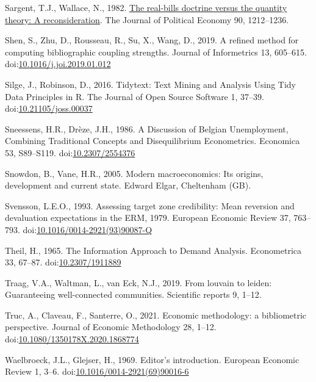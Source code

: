 \documentclass[
  12pt,
  onecolumn]{article}
\newlength{\cslhangindent}
\newlength{\cslentryspacingunit} %
\newenvironment{CSLReferences}[2] %
 {%
  \setlength{\parindent}{0pt}
  \ifodd #1
  \let\oldpar\par
  \def\par{\hangindent=\cslhangindent\oldpar}
  \fi
  \setlength{\parskip}{#2\cslentryspacingunit}
 }%
 {}
\begin{document}
\begin{CSLReferences}{1}{0}
\leavevmode{}%
Sargent, T.J., Wallace, N., 1982. \href{http://www.jstor.org/stable/1830945}{The real-bills doctrine versus the quantity theory: {A} reconsideration}. The Journal of Political Economy 90, 1212--1236.

\leavevmode{}%
Shen, S., Zhu, D., Rousseau, R., Su, X., Wang, D., 2019. A refined method for computing bibliographic coupling strengths. Journal of Informetrics 13, 605--615. doi:\href{https://doi.org/10.1016/j.joi.2019.01.012}{10.1016/j.joi.2019.01.012}

\leavevmode{}%
Silge, J., Robinson, D., 2016. Tidytext: {Text Mining} and {Analysis Using Tidy Data Principles} in {R}. The Journal of Open Source Software 1, 37--39. doi:\href{https://doi.org/10.21105/joss.00037}{10.21105/joss.00037}

\leavevmode{}%
Sneessens, H.R., Drèze, J.H., 1986. A {Discussion} of {Belgian Unemployment}, {Combining Traditional Concepts} and {Disequilibrium Econometrics}. Economica 53, S89--S119. doi:\href{https://doi.org/10.2307/2554376}{10.2307/2554376}

\leavevmode{}%
Snowdon, B., Vane, H.R., 2005. Modern macroeconomics: Its origins, development and current state. {Edward Elgar}, {Cheltenham (GB)}.

\leavevmode{}%
Svensson, L.E.O., 1993. Assessing target zone credibility: {Mean} reversion and devaluation expectations in the {ERM}, 1979. European Economic Review 37, 763--793. doi:\href{https://doi.org/10.1016/0014-2921(93)90087-Q}{10.1016/0014-2921(93)90087-Q}

\leavevmode{}%
Theil, H., 1965. The {Information Approach} to {Demand Analysis}. Econometrica 33, 67--87. doi:\href{https://doi.org/10.2307/1911889}{10.2307/1911889}

\leavevmode{}%
Traag, V.A., Waltman, L., van Eck, N.J., 2019. From louvain to leiden: Guaranteeing well-connected communities. Scientific reports 9, 1--12.

\leavevmode{}%
Truc, A., Claveau, F., Santerre, O., 2021. Economic methodology: a bibliometric perspective. Journal of Economic Methodology 28, 1--12. doi:\href{https://doi.org/10.1080/1350178X.2020.1868774}{10.1080/1350178X.2020.1868774}

\leavevmode{}%
Waelbroeck, J.L., Glejser, H., 1969. Editor's introduction. European Economic Review 1, 3--6. doi:\href{https://doi.org/10.1016/0014-2921(69)90016-6}{10.1016/0014-2921(69)90016-6}

\end{CSLReferences}
\end{document}
